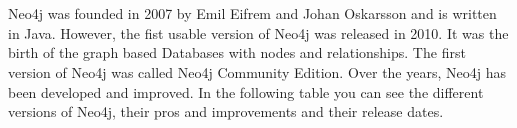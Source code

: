 \usepackage{lipsum}
\usepackage{listings}
\usepackage{hyperref}%

\section{} \label{sec:history}
Neo4j was founded in 2007 by Emil Eifrem and Johan Oskarsson and is written in Java.
However, the fist usable version of Neo4j was released in 2010.
It was the birth of the graph based Databases with nodes and relationships.
The first version of Neo4j was called Neo4j Community Edition.
Over the years, Neo4j has been developed and improved.
In the following table you can see the different versions of Neo4j, their pros and improvements and their release dates.
